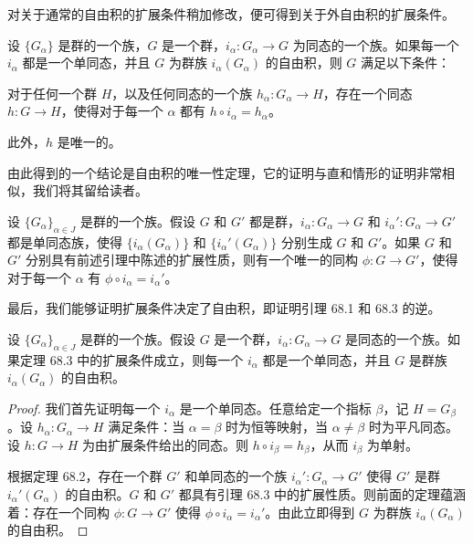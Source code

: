 \documentclass[../../main.tex]{subfiles}
\begin{document}
对关于通常的自由积的扩展条件稍加修改，便可得到关于外自由积的扩展条件。

\begin{theorem}[外自由积的扩展条件]\label{theorem:ch11-external-extension-condition}
设 $\{G_\alpha\}$ 是群的一个族，$G$ 是一个群，$i_\alpha:G_\alpha\to G$ 为同态的一个族。如果每一个 $i_\alpha$ 都是一个单同态，并且 $G$ 为群族 $i_\alpha(G_\alpha)$ 的自由积，则 $G$ 满足以下条件：

对于任何一个群 $H$，以及任何同态的一个族 $h_\alpha:G_\alpha\to H$，存在一个同态 $h:G\to H$，使得对于每一个 $\alpha$ 都有 $h\circ i_\alpha=h_\alpha$。

此外，$h$ 是唯一的。
\end{theorem}

由此得到的一个结论是自由积的唯一性定理，它的证明与直和情形的证明非常相似，我们将其留给读者。

\begin{theorem}[自由积的唯一性]\label{theorem:ch11-uniqueness-of-free-product}
设 $\{G_\alpha\}_{\alpha\in J}$ 是群的一个族。假设 $G$ 和 $G'$ 都是群，$i_\alpha:G_\alpha\to G$ 和 $i_\alpha':G_\alpha\to G'$ 都是单同态族，使得 $\{i_\alpha(G_\alpha)\}$ 和 $\{i_\alpha'(G_\alpha)\}$ 分别生成 $G$ 和 $G'$。如果 $G$ 和 $G'$ 分别具有前述引理中陈述的扩展性质，则有一个唯一的同构 $\phi:G\to G'$，使得对于每一个 $\alpha$ 有 $\phi\circ i_\alpha=i_\alpha'$。
\end{theorem}

最后，我们能够证明扩展条件决定了自由积，即证明引理 68.1 和 68.3 的逆。

\begin{lemma}\label{lemma:ch11-converse-extension}
设 $\{G_\alpha\}_{\alpha\in J}$ 是群的一个族。假设 $G$ 是一个群，$i_\alpha:G_\alpha\to G$ 是同态的一个族。如果定理 68.3 中的扩展条件成立，则每一个 $i_\alpha$ 都是一个单同态，并且 $G$ 是群族 $i_\alpha(G_\alpha)$ 的自由积。
\end{lemma}

\begin{proof}
我们首先证明每一个 $i_\alpha$ 是一个单同态。任意给定一个指标 $\beta$，记 $H=G_\beta$。设 $h_\alpha:G_\alpha\to H$ 满足条件：当 $\alpha=\beta$ 时为恒等映射，当 $\alpha\neq\beta$ 时为平凡同态。设 $h:G\to H$ 为由扩展条件给出的同态。则 $h\circ i_\beta=h_\beta$，从而 $i_\beta$ 为单射。

根据定理 68.2，存在一个群 $G'$ 和单同态的一个族 $i_\alpha':G_\alpha\to G'$ 使得 $G'$ 是群 $i_\alpha'(G_\alpha)$ 的自由积。$G$ 和 $G'$ 都具有引理 68.3 中的扩展性质。则前面的定理蕴涵着：存在一个同构 $\phi:G\to G'$ 使得 $\phi\circ i_\alpha=i_\alpha'$。由此立即得到 $G$ 为群族 $i_\alpha(G_\alpha)$ 的自由积。
\end{proof}
\end{document}
